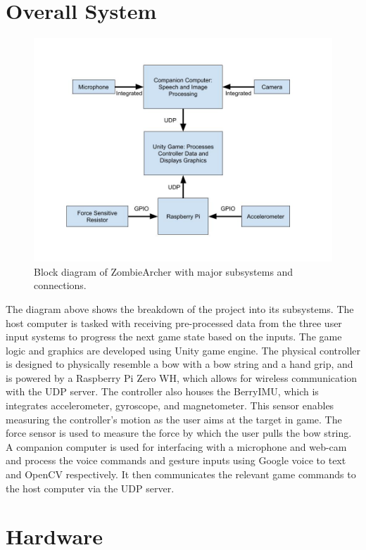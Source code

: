 \documentclass[titlepage, 12pt]{scrartcl}
\begin{document}
\section{Overall System}
    \begin{figure}
        \centering
        \includegraphics[scale=0.4]{figures/Block_Diagram.jpg}
        \caption{Block diagram of ZombieArcher with major subsystems and connections.}
        \label{fig:Block_Diagram}
    \end{figure}
    The diagram above shows the breakdown of the project into its subsystems. The host computer is tasked with receiving pre-processed data from the three user input systems to progress the next game state based on the inputs. The game logic and graphics are developed using Unity game engine. The physical controller is designed to physically resemble a bow with a bow string and a hand grip, and is powered by a Raspberry Pi Zero WH, which allows for wireless communication with the UDP server. The controller also houses the BerryIMU, which is integrates accelerometer, gyroscope, and magnetometer. This sensor enables measuring the controller's motion as the user aims at the target in game. The force sensor is used to measure the force by which the user pulls the bow string. A companion computer is used for interfacing with a microphone and web-cam and process the voice commands and gesture inputs using Google voice to text and OpenCV respectively. It then communicates the relevant game commands to the host computer via the UDP server. \par
    
\section{Hardware} 
\end{document}
